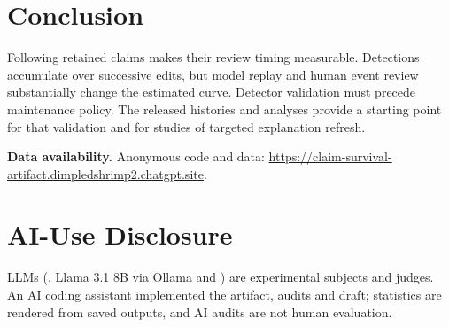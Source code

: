 \section{Conclusion}\label{sec:conclusion}
Following retained claims makes their review timing measurable. Detections accumulate over successive edits, but model replay and human event review substantially change the estimated curve. Detector validation must precede maintenance policy. The released histories and analyses provide a starting point for that validation and for studies of targeted explanation refresh.

\noindent\textbf{Data availability.} Anonymous code and data: \url{https://claim-survival-artifact.dimpledshrimp2.chatgpt.site}.

\section*{AI-Use Disclosure}
LLMs (\XBulkModel{}, Llama 3.1 8B via Ollama and \XSecondModel{}) are experimental subjects and judges. An AI coding assistant implemented the artifact, audits and draft; statistics are rendered from saved outputs, and AI audits are not human evaluation.
